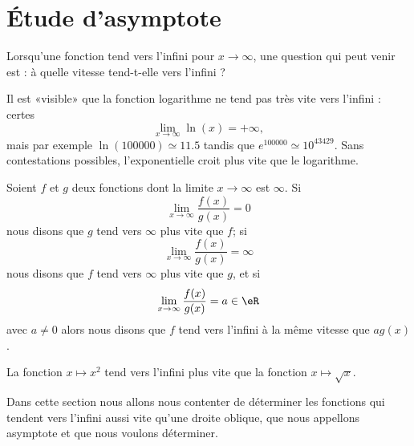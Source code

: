 
\section{Étude d'asymptote}

Lorsqu'une fonction tend vers l'infini pour \( x\to \infty\), une question qui peut venir est : à quelle vitesse tend-t-elle vers l'infini ?

Il est «visible» que la fonction logarithme ne tend pas très vite vers l'infini : certes
\begin{equation}
	\lim_{x\to \infty} \ln(x)=+\infty,
\end{equation}
mais par exemple \( \ln(100000)\simeq 11.5\) tandis que \(  e^{100000}\simeq 10^{43429}\). Sans contestations possibles, l'exponentielle croit plus vite que le logarithme.

Soient \( f\) et \( g\) deux fonctions dont la limite \( x\to \infty\) est \( \infty\). Si
\begin{equation}
	\lim_{x\to \infty} \frac{ f(x) }{ g(x) }=0
\end{equation}
nous disons que \( g\) tend vers \( \infty\) plus vite que \( f\); si
\begin{equation}
	\lim_{x\to \infty} \frac{ f(x) }{ g(x) }=\infty
\end{equation}
nous disons que \( f\) tend vers \( \infty\) plus vite que \( g\), et si
\begin{equation}
	\lim_{x\to \infty} \frac{ f(x) }{ g(x) }=a\in \eR
\end{equation}
avec \( a\neq 0\) alors nous disons que \( f\) tend vers l'infini à la même vitesse que \( ag(x)\).

\begin{example}
	La fonction \( x\mapsto x^2\) tend vers l'infini plus vite que la fonction \( x\mapsto \sqrt{x}\).
\end{example}

Dans cette section nous allons nous contenter de déterminer les fonctions qui tendent vers l'infini aussi vite qu'une droite oblique, que nous appellons asymptote et que nous voulons déterminer.


